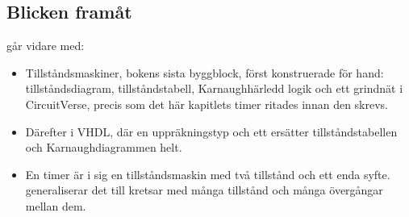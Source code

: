 \subsection*{Blicken framåt}
 går vidare med:
\begin{itemize}
  \item Tillståndsmaskiner, bokens sista byggblock, först konstruerade för hand: tillståndsdiagram,
    tillståndstabell, Karnaughhärledd logik och ett grindnät i CircuitVerse, precis som det här
    kapitlets timer ritades innan den skrevs.
  \item Därefter i VHDL, där en uppräkningstyp och ett  ersätter tillståndstabellen och
    Karnaughdiagrammen helt.
  \item En timer är i sig en tillståndsmaskin med två tillstånd och ett enda syfte.
     generaliserar det till kretsar med många tillstånd och många övergångar mellan
    dem.
\end{itemize}
